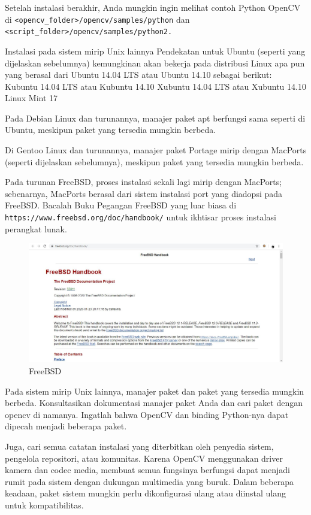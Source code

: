 \begin{enumerate}
\begin{enumerate}
Setelah instalasi berakhir, Anda mungkin ingin melihat contoh Python OpenCV di
\verb|<opencv_folder>/opencv/samples/python| dan
\verb|<script_folder>/opencv/samples/python2.|

Instalasi pada sistem mirip Unix lainnya
Pendekatan untuk Ubuntu (seperti yang dijelaskan sebelumnya) kemungkinan akan bekerja pada distribusi Linux apa pun yang berasal dari Ubuntu 14.04 LTS atau Ubuntu 14.10 sebagai berikut:
Kubuntu 14.04 LTS atau Kubuntu 14.10
Xubuntu 14.04 LTS atau Xubuntu 14.10
Linux Mint 17

Pada Debian Linux dan turunannya, manajer paket apt berfungsi sama seperti di Ubuntu, meskipun paket yang tersedia mungkin berbeda.

Di Gentoo Linux dan turunannya, manajer paket Portage mirip dengan MacPorts (seperti dijelaskan sebelumnya), meskipun paket yang tersedia mungkin berbeda.

Pada turunan FreeBSD, proses instalasi sekali lagi mirip dengan MacPorts; sebenarnya, MacPorts berasal dari sistem instalasi port yang diadopsi pada FreeBSD. Bacalah Buku Pegangan FreeBSD yang luar biasa di \newline \verb|https://www.freebsd.org/doc/handbook/| untuk ikhtisar proses instalasi perangkat lunak.
		\begin{figure}[ht]
		\centering
		\includegraphics[scale=0.4]{figures/1,15.jpg}
		\caption{FreeBSD}
		\label{contoh}
		\end{figure}
\newpage
Pada sistem mirip Unix lainnya, manajer paket dan paket yang tersedia mungkin berbeda. Konsultasikan dokumentasi manajer paket Anda dan cari paket dengan opencv di namanya. Ingatlah bahwa OpenCV dan binding Python-nya dapat dipecah menjadi beberapa
paket.

Juga, cari semua catatan instalasi yang diterbitkan oleh penyedia sistem, pengelola repositori, atau komunitas. Karena OpenCV menggunakan driver kamera dan codec media, membuat semua fungsinya berfungsi dapat menjadi rumit pada sistem dengan dukungan multimedia yang buruk. Dalam beberapa keadaan, paket sistem mungkin perlu dikonfigurasi ulang atau diinstal ulang untuk kompatibilitas.


\end{enumerate}
\end{enumerate}
